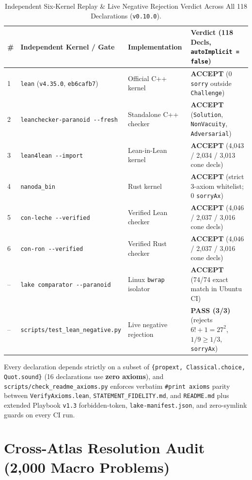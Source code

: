 \documentclass[11pt,reqno]{amsart}
\theoremstyle{plain}
\theoremstyle{definition}
\newcommand{\code}[1]{{\upshape\nolinkurl{#1}}}
\begin{document}
\begin{table}[htbp]
\centering
\caption{Independent Six-Kernel Replay \& Live Negative Rejection Verdict Across All 118 Declarations (\texttt{v0.10.0}).}
\label{tab:kernels}
\footnotesize
\begin{tabularx}{\textwidth}{@{}lll>{\raggedright\arraybackslash}X@{}}
\toprule
\# & Independent Kernel / Gate & Implementation & Verdict (118 Decls, \code{autoImplicit = false}) \\
\midrule
1 & \code{lean} (\texttt{v4.35.0}, \code{eb6cafb7}) & Official C++ kernel & \textbf{ACCEPT} (0 \code{sorry} outside \code{Challenge}) \\
2 & \code{leanchecker-paranoid --fresh} & Standalone C++ checker & \textbf{ACCEPT} (\code{Solution}, \code{NonVacuity}, \code{Adversarial}) \\
3 & \code{lean4lean --import} & Lean-in-Lean kernel & \textbf{ACCEPT} (4,043 / 2,034 / 3,013 cone decls) \\
4 & \code{nanoda_bin} & Rust kernel & \textbf{ACCEPT} (strict 3-axiom whitelist; 0 \code{sorryAx}) \\
5 & \code{con-leche --verified} & Verified Lean checker & \textbf{ACCEPT} (4,046 / 2,037 / 3,016 cone decls) \\
6 & \code{con-ron --verified} & Verified Rust checker & \textbf{ACCEPT} (4,046 / 2,037 / 3,016 cone decls) \\
-- & \code{lake comparator --paranoid} & Linux \code{bwrap} isolator & \textbf{ACCEPT} (74/74 exact match in Ubuntu CI) \\
-- & \code{scripts/test_lean_negative.py} & Live negative rejection & \textbf{PASS (3/3)} (rejects $6!+1=27^2$, $1/9 \ge 1/3$, \code{sorryAx}) \\
\bottomrule
\end{tabularx}
\end{table}

Every declaration depends strictly on a subset of \texttt{\{propext, Classical.choice, Quot.sound\}}
(16 declarations use \textbf{zero axioms}), and \code{scripts/check_readme_axioms.py} enforces
verbatim \texttt{\#print axioms} parity between \code{VerifyAxioms.lean}, \code{STATEMENT_FIDELITY.md},
and \code{README.md} plus extended Playbook \texttt{v1.3} forbidden-token, \code{lake-manifest.json},
and zero-symlink guards on every CI run.

\section{Cross-Atlas Resolution Audit (2,000 Macro Problems)}\label{sec:crossatlas}
\end{document}
